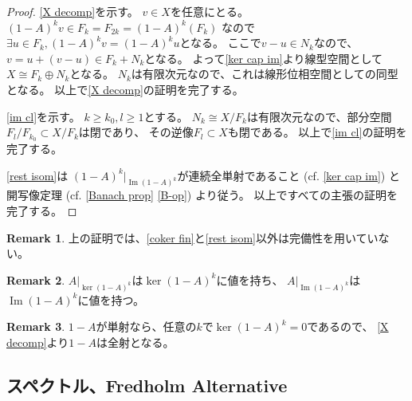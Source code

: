 \documentclass[uplatex]{jsarticle}
\theoremstyle{definition}
\newtheorem{rem}[rem]{Remark}
\DeclareMathOperator{\im}{\mathrm{Im}}
\begin{document}
\begin{proof}
  \ref{X decomp}を示す。
  \(v\in X\)を任意にとる。
  \((1-A)^k v \in F_k = F_{2k} = (1-A)^k(F_k)\)
  なので\(\exists u\in F_k, (1-A)^k v = (1-A)^k u\)となる。
  ここで\(v-u\in N_k\)なので、\(v = u+(v-u) \in F_k + N_k\)となる。
  よって\ref{ker cap im}より線型空間として\(X\cong F_k\oplus N_k\)となる。
  \(N_k\)は有限次元なので、これは線形位相空間としての同型となる。
  以上で\ref{X decomp}の証明を完了する。

  \ref{im cl}を示す。
  \(k\geq k_0, l \geq 1\)とする。
  \(N_k\cong X/F_k\)は有限次元なので、部分空間
  \(F_l/F_{k_0}\subset X/F_k\)は閉であり、
  その逆像\(F_l\subset X\)も閉である。
  以上で\ref{im cl}の証明を完了する。

  \ref{rest isom}は
  \((1-A)^k|_{\im(1-A)^k}\)が連続全単射であること (cf. \ref{ker cap im}) と
  開写像定理 (cf. \autoref{Banach prop} \ref{B-op}) より従う。
  以上ですべての主張の証明を完了する。
\end{proof}


\begin{rem}
  上の証明では、\ref{coker fin}と\ref{rest isom}以外は完備性を用いていない。
\end{rem}


\begin{rem}
  \(A|_{\ker(1-A)^k}\)は\(\ker(1-A)^k\)に値を持ち、
  \(A|_{\im(1-A)^k}\)は\(\im(1-A)^k\)に値を持つ。
\end{rem}



\begin{rem}
  \label{rem: cpt inj isom}
  \(1-A\)が単射なら、任意の\(k\)で\(\ker(1-A)^k = 0\)であるので、
  \ref{X decomp}より\(1-A\)は全射となる。
\end{rem}










\subsection{スペクトル、Fredholm Alternative}
\end{document}
